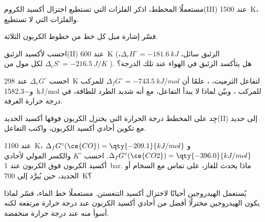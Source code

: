 \begin{exercise}[$\star$]\label{exo:b2:ellingham:3}
مستعملًا المخطط، اذكر الفلزات التي تستطيع اختزال أكسيد الكروم(III) عند
\qty{1500}{K}، والفلزات التي لا تستطيع.
\end{exercise}

\begin{exercise}[$\star$]\label{exo:b2:ellingham:4}
فسّر إشارة ميل كل خط من خطوط الكربون الثلاثة.
\end{exercise}

\begin{exercise}[$\star\star$]\label{exo:b2:ellingham:5}
احسب  لأكسيد الزئبق(II) عند \qty{600}{K}
(الزئبق سائل، $\Delta_r H^\circ = \qty{-181.6}{kJ}$، $\Delta_r S^\circ =
\qty{-216.5}{J/K}$ لكل مول من ). هل يتأكسد الزئبق في الهواء عند تلك
الدرجة؟
\end{exercise}

\begin{exercise}[$\star\star$]\label{exo:b2:ellingham:6}
احسب $\Delta_r G^\circ$ عند \qty{298}{K} لتفاعل الثرميت، ، علمًا أن $\Delta_f G^\circ = \qty{-743.5}{kJ/mol}$ للمركب
 و\qty{-1582.3}{kJ/mol} للمركب ، وبيّن لماذا لا يبدأ التفاعل،
مع أنه شديد الطرد للطاقة، في درجة حرارة الغرفة.
\end{exercise}

\begin{exercise}[$\star\star$]\label{exo:b2:ellingham:7}
جِد على المخطط درجة الحرارة التي يختزل الكربون فوقها أكسيد الحديد(II)
إلى حديد مع تكوين أحادي أكسيد الكربون، واكتب التفاعل.
\end{exercise}

\begin{exercise}[$\star\star$]\label{exo:b2:ellingham:8}
عند \qty{1100}{K}، $\Delta_f G^\circ(\ce{CO}) = \qty{-209.1}{kJ/mol}$ 
و$\Delta_f G^\circ(\ce{CO2}) = \qty{-396.0}{kJ/mol}$. احسب $K^\circ$  والكسر المولي لأحادي أكسيد الكربون فوق الكربون عند
\qty{1}{bar}. ماذا يحدث للغاز، على تماس مع السخام أو الحديد، حين
يُبرَّد إلى \qty{700}{K}؟
\end{exercise}

\begin{exercise}[$\star\star$]\label{exo:b2:ellingham:9}
يُستعمل الهيدروجين أحيانًا لاختزال أكسيد التنغستن. مستعملًا خط الماء،
فسّر لماذا يكون الهيدروجين مختزلًا أفضل من أحادي أكسيد الكربون عند درجة حرارة
مرتفعة لكنه أسوأ منه عند درجة حرارة منخفضة.
\end{exercise}

